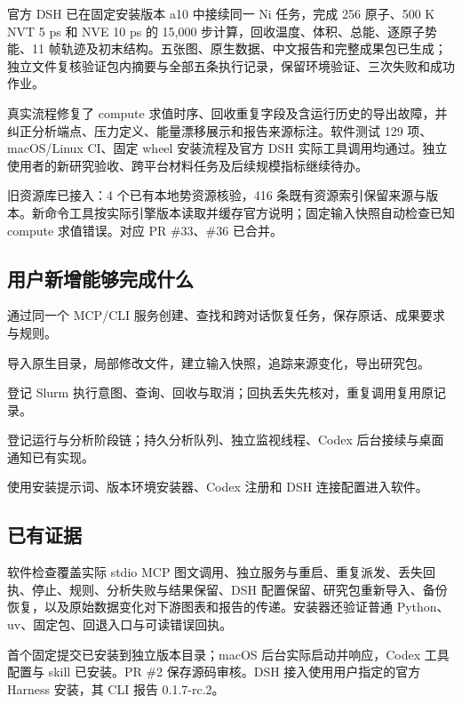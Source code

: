 \documentclass[11pt,a4paper]{ctexart}
\begin{document}
官方 DSH 已在固定安装版本 a10 中接续同一 Ni 任务，完成 256 原子、500 K NVT 5 ps 和 NVE 10 ps 的 15,000 步计算，回收温度、体积、总能、逐原子势能、11 帧轨迹及初末结构。五张图、原生数据、中文报告和完整成果包已生成；独立文件复核验证包内摘要与全部五条执行记录，保留环境验证、三次失败和成功作业。



真实流程修复了 compute 求值时序、回收重复字段及含运行历史的导出故障，并纠正分析端点、压力定义、能量漂移展示和报告来源标注。软件测试 129 项、macOS/\allowbreak{}Linux CI、固定 wheel 安装流程及官方 DSH 实际工具调用均通过。独立使用者的新研究验收、跨平台材料任务及后续规模指标继续待办。



旧资源库已接入：4 个已有本地势资源核验，416 条既有资源索引保留来源与版本。新命令工具按实际引擎版本读取并缓存官方说明；固定输入快照自动检查已知 compute 求值错误。对应 PR \#33、\#36 已合并。



\subsection{用户新增能够完成什么}


\noindent\textbullet\quad 通过同一个 MCP/\allowbreak{}CLI 服务创建、查找和跨对话恢复任务，保存原话、成果要求与规则。


\noindent\textbullet\quad 导入原生目录，局部修改文件，建立输入快照，追踪来源变化，导出研究包。


\noindent\textbullet\quad 登记 Slurm 执行意图、查询、回收与取消；回执丢失先核对，重复调用复用原记录。


\noindent\textbullet\quad 登记运行与分析阶段链；持久分析队列、独立监视线程、Codex 后台接续与桌面通知已有实现。


\noindent\textbullet\quad 使用安装提示词、版本环境安装器、Codex 注册和 DSH 连接配置进入软件。




\subsection{已有证据}


软件检查覆盖实际 stdio MCP 图文调用、独立服务与重启、重复派发、丢失回执、停止、规则、分析失败与结果保留、DSH 配置保留、研究包重新导入、备份恢复，以及原始数据变化对下游图表和报告的传递。安装器还验证普通 Python、uv、固定包、回退入口与可读错误回执。



首个固定提交已安装到独立版本目录；macOS 后台实际启动并响应，Codex 工具配置与 skill 已安装。PR \#2 保存源码审核。DSH 接入使用用户指定的官方 Harness 安装，其 CLI 报告 0.1.7-rc.2。
\end{document}
